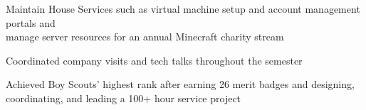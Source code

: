 


\medskip
{}

Maintain House Services such as virtual machine setup and account management portals and \\ manage server resources for an annual Minecraft charity stream

\divider

Coordinated company visits and tech talks throughout the semester

\divider

Achieved Boy Scouts' highest rank after earning 26 merit badges and designing, coordinating, and leading a 100+ hour service project

